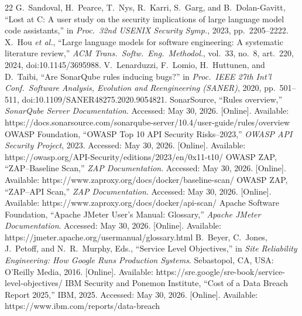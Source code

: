 \documentclass[conference,letterpaper]{IEEEtran}
\begin{document}
\begin{thebibliography}{22}
 G.~Sandoval, H.~Pearce, T.~Nys, R.~Karri, S.~Garg, and B.~Dolan-Gavitt, ``Lost at C: A user study on the security implications of large language model code assistants,'' in \emph{Proc.\ 32nd USENIX Security Symp.}, 2023, pp.~2205--2222.
 X.~Hou \textit{et al.}, ``Large language models for software engineering: A systematic literature review,'' \emph{ACM Trans.\ Softw.\ Eng.\ Methodol.}, vol.~33, no.~8, art.~220, 2024, doi:10.1145/3695988.
 V.~Lenarduzzi, F.~Lomio, H.~Huttunen, and D.~Taibi, ``Are SonarQube rules inducing bugs?'' in \emph{Proc.\ IEEE 27th Int'l Conf.\ Software Analysis, Evolution and Reengineering (SANER)}, 2020, pp.~501--511, doi:10.1109/SANER48275.2020.9054821.
 SonarSource, ``Rules overview,'' \emph{SonarQube Server Documentation}. Accessed: May 30, 2026. [Online]. Available: https://docs.sonarsource.com/sonarqube-server/10.4/user-guide/rules/overview
 OWASP Foundation, ``OWASP Top 10 API Security Risks--2023,'' \emph{OWASP API Security Project}, 2023. Accessed: May 30, 2026. [Online]. Available: https://owasp.org/API-Security/editions/2023/en/0x11-t10/
 OWASP ZAP, ``ZAP--Baseline Scan,'' \emph{ZAP Documentation}. Accessed: May 30, 2026. [Online]. Available: https://www.zaproxy.org/docs/docker/baseline-scan/
 OWASP ZAP, ``ZAP--API Scan,'' \emph{ZAP Documentation}. Accessed: May 30, 2026. [Online]. Available: https://www.zaproxy.org/docs/docker/api-scan/
 Apache Software Foundation, ``Apache JMeter User's Manual: Glossary,'' \emph{Apache JMeter Documentation}. Accessed: May 30, 2026. [Online]. Available: https://jmeter.apache.org/usermanual/glossary.html
 B.~Beyer, C.~Jones, J.~Petoff, and N.~R.~Murphy, Eds., ``Service Level Objectives,'' in \emph{Site Reliability Engineering: How Google Runs Production Systems}. Sebastopol, CA, USA: O'Reilly Media, 2016. [Online]. Available: https://sre.google/sre-book/service-level-objectives/
 IBM Security and Ponemon Institute, ``Cost of a Data Breach Report 2025,'' IBM, 2025. Accessed: May 30, 2026. [Online]. Available: https://www.ibm.com/reports/data-breach
\end{thebibliography}
\end{document}

